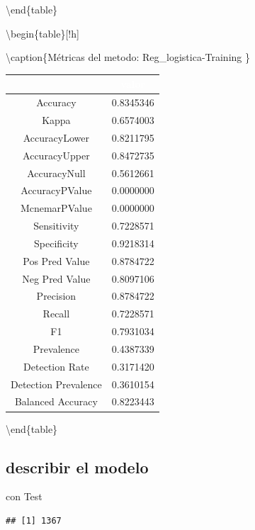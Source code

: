 \documentclass[]{article}
\begin{document}
\textbackslash{}end\{table\}

\textbackslash{}begin\{table\}{[}!h{]}

\textbackslash{}caption\{\label{tab:metricas_Reg_logistica-Training}Métricas
del metodo: Reg\_logistica-Training \} \centering

\begin{tabular}[t]{cc}
\toprule
\rowcolor{black}  \multicolumn{1}{c}{\textcolor{white}{\textbf{metricas}}} & \multicolumn{1}{c}{\textcolor{white}{\textbf{valor}}}\\
\midrule
\rowcolor{gray!6}  Accuracy & 0.8345346\\
Kappa & 0.6574003\\
\rowcolor{gray!6}  AccuracyLower & 0.8211795\\
AccuracyUpper & 0.8472735\\
\rowcolor{gray!6}  AccuracyNull & 0.5612661\\
\addlinespace
AccuracyPValue & 0.0000000\\
\rowcolor{gray!6}  McnemarPValue & 0.0000000\\
Sensitivity & 0.7228571\\
\rowcolor{gray!6}  Specificity & 0.9218314\\
Pos Pred Value & 0.8784722\\
\addlinespace
\rowcolor{gray!6}  Neg Pred Value & 0.8097106\\
Precision & 0.8784722\\
\rowcolor{gray!6}  Recall & 0.7228571\\
F1 & 0.7931034\\
\rowcolor{gray!6}  Prevalence & 0.4387339\\
\addlinespace
Detection Rate & 0.3171420\\
\rowcolor{gray!6}  Detection Prevalence & 0.3610154\\
Balanced Accuracy & 0.8223443\\
\bottomrule
\end{tabular}

\textbackslash{}end\{table\}

\hypertarget{describir-el-modelo-7}{%
\subsection{describir el modelo}\label{describir-el-modelo-7}}

con Test

\begin{lstlisting}
## [1] 1367
\end{lstlisting}
\end{document}
